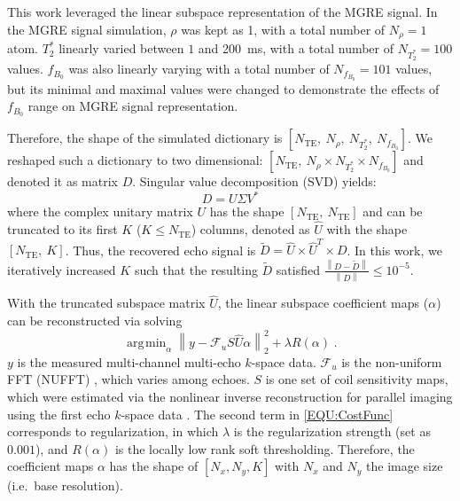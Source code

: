 \documentclass[a4paper,11pt]{article}
\DeclareMathOperator*{\argmin}{\arg\!\min}
\newcommand*{\norm}[1]{\left\lVert#1\right\rVert}
\begin{document}
This work leveraged the linear subspace representation of the MGRE signal. 
In the MGRE signal simulation, $\rho$ was kept as 1, 
with a total number of $N_\rho = 1$ atom. 
$T_2^*$ linearly varied between $1$ and \SI{200}{ms}, 
with a total number of $N_{T_2^*} = 100$ values.
$f_{B_0}$ was also linearly varying with a total number of $N_{f_{B_0}} = 101$ values, 
but its minimal and maximal values were changed to 
demonstrate the effects of $f_{B_0}$ range on MGRE signal representation.

Therefore, the shape of the simulated dictionary is 
$[N_\text{TE},~ N_\rho,~ N_{T_2^*},~ N_{f_{B_0}}]$. 
We reshaped such a dictionary to two dimensional: 
$[N_\text{TE},~ N_\rho \times N_{T_2^*} \times N_{f_{B_0}}]$ 
and denoted it as matrix $D$. 
Singular value decomposition (SVD) yields:
\begin{equation}
	D = U \Sigma V^*
\end{equation}
where the complex unitary matrix $U$ has the shape $[N_\text{TE},~ N_\text{TE}]$
and can be truncated to its first $K$ ($K \leq N_\text{TE}$) columns, 
denoted as $\hat{U}$ with the shape $[N_\text{TE},~ K]$. 
Thus, the recovered echo signal is 
$\tilde{D} = \hat{U} \times \hat{U}^T \times D$. 
In this work, we iteratively increased $K$ 
such that the resulting $\tilde{D}$ satisfied 
$\frac{\norm{D - \tilde{D}}}{\norm{D}} \leq 10^{-5}$.

With the truncated subspace matrix $\hat{U}$, the linear subspace coefficient maps ($\alpha$)
can be reconstructed via solving
\begin{equation}
	\argmin_\alpha \norm{y - \mathcal{F}_u S \hat{U} \alpha}_2^2 + \lambda R(\alpha) \; .
	\label{EQU:CostFunc}
\end{equation}
$y$ is the measured multi-channel multi-echo $k$-space data. 
$\mathcal{F}_u$ is the non-uniform FFT (NUFFT) 
\cite{fessler_2003_nufft,beatty_2005_nufft}, which varies among echoes.
$S$ is one set of coil sensitivity maps, 
which were estimated via the nonlinear inverse reconstruction for parallel imaging 
using the first echo $k$-space data \cite{uecker_2008_nlinv}. 
The second term in \cref{EQU:CostFunc} corresponds to regularization, 
in which $\lambda$ is the regularization strength (set as $0.001$), 
and $R(\alpha)$ is the locally low rank soft thresholding. 
Therefore, the coefficient maps $\alpha$ has the shape of $[N_x, N_y, K]$ 
with $N_x$ and $N_y$ the image size (i.e.~base resolution).
\end{document}
